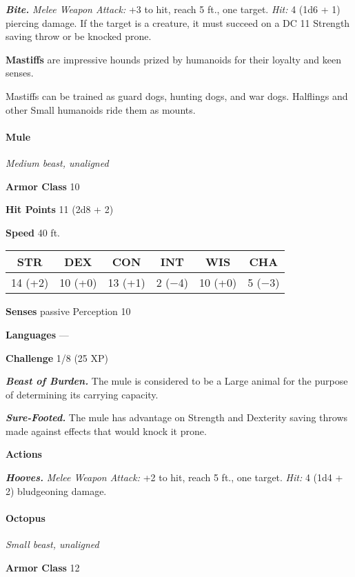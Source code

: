 \documentclass[
]{article}
\begin{document}
\emph{\textbf{Bite.}} \emph{Melee Weapon Attack:} +3 to hit, reach 5
ft., one target. \emph{Hit:} 4 (1d6 + 1) piercing damage. If the target
is a creature, it must succeed on a DC 11 Strength saving throw or be
knocked prone.

\textbf{Mastiffs} are impressive hounds prized by humanoids for their
loyalty and keen senses.

Mastiffs can be trained as guard dogs, hunting dogs, and war dogs.
Halflings and other Small humanoids ride them as mounts.

\hypertarget{mule}{%
\paragraph{Mule}\label{mule}}

\emph{Medium beast, unaligned}

\textbf{Armor Class} 10

\textbf{Hit Points} 11 (2d8 + 2)

\textbf{Speed} 40 ft.

\begin{longtable}[]{@{}cccccc@{}}
\toprule
STR & DEX & CON & INT & WIS & CHA\tabularnewline
\midrule
\endhead
14 (+2) & 10 (+0) & 13 (+1) & 2 (−4) & 10 (+0) & 5 (−3)\tabularnewline
\bottomrule
\end{longtable}

\textbf{Senses} passive Perception 10

\textbf{Languages} ---

\textbf{Challenge} 1/8 (25 XP)

\emph{\textbf{Beast of Burden.}} The mule is considered to be a Large
animal for the purpose of determining its carrying capacity.

\emph{\textbf{Sure-Footed.}} The mule has advantage on Strength and
Dexterity saving throws made against effects that would knock it prone.

\textbf{Actions}

\emph{\textbf{Hooves.}} \emph{Melee Weapon Attack:} +2 to hit, reach 5
ft., one target. \emph{Hit:} 4 (1d4 + 2) bludgeoning damage.

\hypertarget{octopus}{%
\paragraph{Octopus}\label{octopus}}

\emph{Small beast, unaligned}

\textbf{Armor Class} 12
\end{document}
